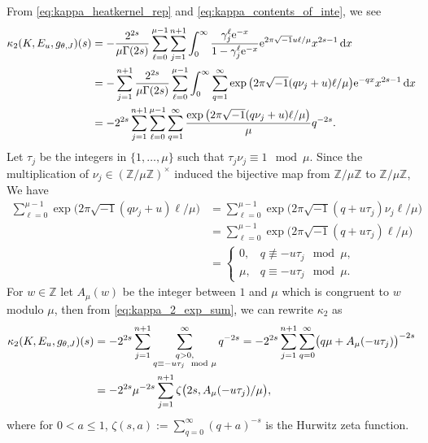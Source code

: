 \documentclass[10pt,a4paper]{amsart}
\numberwithin{equation}{section}
\newcommand{\ii}{\sqrt{-1}}
\begin{document}
From \eqref{eq:kappa_heatkernel_rep} and \eqref{eq:kappa_contents_of_inte},
we see
\begin{align}
 \kappa_{2} (K, E_{u} , g_{\theta , J} ) (s)
 & =
 -
 \frac{
 2^{2s}
 }{
 \mu \Gamma (2s)
 }
 \sum_{\ell = 0}^{\mu-1}
 \sum_{j=1}^{n+1}
 \int_{0}^{\infty} \frac{\gamma_j^{\ell} {\rm e}^{-x}}{1 - \gamma_j^{\ell} {\rm e}^{-x}}
 {\rm e}^{ 2 \pi \ii u \ell / \mu } x^{2s-1} \, {\rm d}x
 \notag
 \\
 & =
 -
 \sum_{j=1}^{n+1}
 \frac{
 2^{2s}
 }{
 \mu \Gamma (2s)
 }
 \sum_{\ell = 0}^{\mu -1}
 \int_{0}^{\infty} \sum_{q=1}^{\infty} \exp \big( 2 \pi \ii (q \nu_j + u ) \ell / \mu \big) {\rm e}^{-qx} x^{2s-1} \, {\rm d}x
 \notag \\
 & =
 -
 2^{2s}
 \sum_{j=1}^{n+1}
 \sum_{\ell = 0}^{\mu -1}
 \sum_{q=1}^{\infty}
 \frac{
 \exp \big( 2 \pi \ii (q \nu_j + u ) \ell / \mu \big)
 }{
 \mu
 }
 q^{-2s}
 .
 \label{eq:kappa_2_exp_sum}
\end{align}
Let ${\tau}_j$ be the integers in $\{ 1 , \ldots , \mu \}$ such that ${\tau}_j \nu_j \equiv 1 \mod \mu$.
Since the multiplication of $\nu_j \in ( \mathbb{Z} / \mu \mathbb{Z} )^{\times}$ induced the bijective map from $\mathbb{Z} / \mu \mathbb{Z} $ to $\mathbb{Z} / \mu \mathbb{Z} $,
We have
\begin{align*}
 \sum_{\ell = 0}^{\mu -1}
 \exp \big( 2 \pi \ii (q \nu_j + u ) \ell / \mu \big)
 & =
 \sum_{\ell = 0}^{\mu -1}
 \exp \big( 2 \pi \ii (q + u \tau_j ) \nu_j \ell / \mu \big)
 \\
 & =
 \sum_{\ell = 0}^{\mu -1}
 \exp \big( 2 \pi \ii (q + u \tau_j ) \ell / \mu \big)
 \\
 & =
 \begin{cases}
 0 , & q \not \equiv - u \tau_j \mod \mu ,
 \\
 \mu , & q \equiv - u \tau_j \mod \mu .
 \end{cases}
\end{align*}
For $w \in \mathbb{Z}$ let $A_{\mu} ( w )$ be the integer between $1$ and $\mu$ which is congruent to $w$ modulo $\mu$,
then from \eqref{eq:kappa_2_exp_sum}, we can rewrite $\kappa_{2}$ as
\begin{align}
 \kappa_{2} (K, E_{u} , g_{\theta , J} ) (s)
 & =
 -
 2^{2s}
 \sum_{j=1}^{n+1}
 \sum_{\substack{q >0 , \\ q \equiv - u {\tau}_j \mod \mu } }^{\infty}
 q^{-2s}
 =
 -
 2^{2s}
 \sum_{j=1}^{n+1}
 \sum_{q=0}^{\infty}
 \bigl(
 q \mu + A_{\mu} (- u {\tau}_j)
 \bigr)^{-2s}
 \notag
 \\
 & =
 -
 2^{2s} \mu^{-2s}
 \sum_{j=1}^{n+1}
 \zeta \bigl( 2s , A_{\mu} (-u {\tau}_j) / \mu \bigr)
 ,
 \label{eq:kappa_2}
\end{align}
where for $0 < a \leq 1$, $\zeta (s , a) := \sum_{q =0}^{\infty} (q + a)^{-s}$ is the Hurwitz zeta function.
\end{document}
